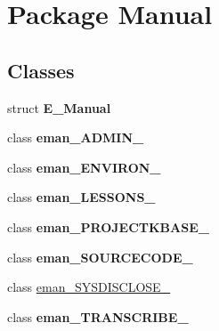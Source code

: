 \hypertarget{namespace_manual}{\section{Package Manual}
\label{namespace_manual}
}
\subsection*{Classes}
\begin{DoxyCompactItemize}
\item 
struct {\bfseries E\+\_\+\+Manual}
\item 
class {\bfseries eman\+\_\+\+A\+D\+M\+I\+N\+\_\+}
\item 
class {\bfseries eman\+\_\+\+E\+N\+V\+I\+R\+O\+N\+\_\+}
\item 
class {\bfseries eman\+\_\+\+L\+E\+S\+S\+O\+N\+S\+\_\+}
\item 
class {\bfseries eman\+\_\+\+P\+R\+O\+J\+E\+C\+T\+K\+B\+A\+S\+E\+\_\+}
\item 
class {\bfseries eman\+\_\+\+S\+O\+U\+R\+C\+E\+C\+O\+D\+E\+\_\+}
\item 
class \hyperlink{class_manual_1_1eman___s_y_s_d_i_s_c_l_o_s_e__}{eman\+\_\+\+S\+Y\+S\+D\+I\+S\+C\+L\+O\+S\+E\+\_\+}
\item 
class {\bfseries eman\+\_\+\+T\+R\+A\+N\+S\+C\+R\+I\+B\+E\+\_\+}
\end{DoxyCompactItemize}
